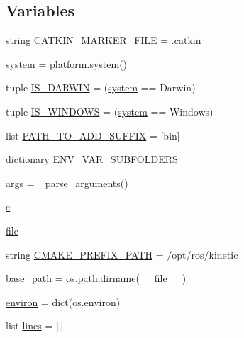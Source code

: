 \subsection*{Variables}
\begin{DoxyCompactItemize}
\item 
string \hyperlink{namespace__setup__util_a3fa0ca5a460a71a43cbc3d4954ab1f10}{C\+A\+T\+K\+I\+N\+\_\+\+M\+A\+R\+K\+E\+R\+\_\+\+F\+I\+LE} = \textquotesingle{}.catkin\textquotesingle{}
\item 
\hyperlink{namespace__setup__util_ae9fca6a80a6923f4580be72f68fee325}{system} = platform.\+system()
\item 
tuple \hyperlink{namespace__setup__util_aecbb100ce6f94bb3c7e16d58fde05f96}{I\+S\+\_\+\+D\+A\+R\+W\+IN} = (\hyperlink{namespace__setup__util_ae9fca6a80a6923f4580be72f68fee325}{system} == \textquotesingle{}Darwin\textquotesingle{})
\item 
tuple \hyperlink{namespace__setup__util_a6fe69c2dbd92959b6651a28cbb846e6e}{I\+S\+\_\+\+W\+I\+N\+D\+O\+WS} = (\hyperlink{namespace__setup__util_ae9fca6a80a6923f4580be72f68fee325}{system} == \textquotesingle{}Windows\textquotesingle{})
\item 
list \hyperlink{namespace__setup__util_a7de27b8c021c888c6288a885f1e9afa9}{P\+A\+T\+H\+\_\+\+T\+O\+\_\+\+A\+D\+D\+\_\+\+S\+U\+F\+F\+IX} = \mbox{[}\textquotesingle{}bin\textquotesingle{}\mbox{]}
\item 
dictionary \hyperlink{namespace__setup__util_aa31804f1be8660156ce9394b33c68dc4}{E\+N\+V\+\_\+\+V\+A\+R\+\_\+\+S\+U\+B\+F\+O\+L\+D\+E\+RS}
\item 
\hyperlink{namespace__setup__util_a547963d07c6371df1c51b1384a2dec28}{args} = \hyperlink{namespace__setup__util_a57d9ecb280810c9a5409d44aeb9d0a25}{\+\_\+parse\+\_\+arguments}()
\item 
\hyperlink{namespace__setup__util_acdce690b925de33d6249bbbfa1109d61}{e}
\item 
\hyperlink{namespace__setup__util_aea63a1b32cc79bc3d872ab7cb30dd07e}{file}
\item 
string \hyperlink{namespace__setup__util_a2a6756158bb4094ed7d259eb564d0578}{C\+M\+A\+K\+E\+\_\+\+P\+R\+E\+F\+I\+X\+\_\+\+P\+A\+TH} = \textquotesingle{}/opt/ros/kinetic\textquotesingle{}
\item 
\hyperlink{namespace__setup__util_a83d25140acd7788bbcb95843fe38e639}{base\+\_\+path} = os.\+path.\+dirname(\+\_\+\+\_\+file\+\_\+\+\_\+)
\item 
\hyperlink{namespace__setup__util_a9a935bdd9ee1aa0327161025bb18c136}{environ} = dict(os.\+environ)
\item 
list \hyperlink{namespace__setup__util_a8618d8be5f729d4c9696daa5e083a001}{lines} = \mbox{[}$\,$\mbox{]}
\end{DoxyCompactItemize}



